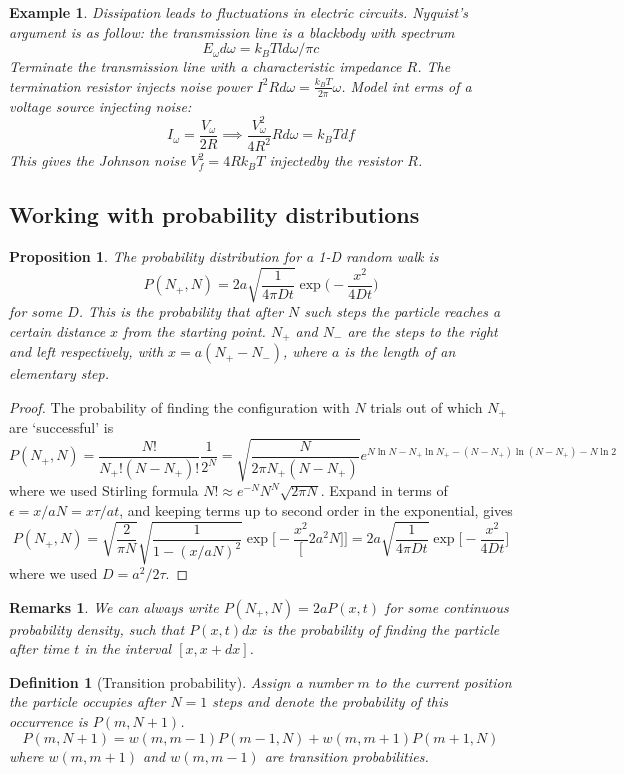 \documentclass[a4paper]{article}
\newtheorem{eg}{Example}[section]
\newtheorem{remarks}{Remarks}[section]
\theoremstyle{new}
\newtheorem{defi}{Definition}[section]
\newtheorem{prop}{Proposition}[section]
\begin{document}
\begin{eg}
Dissipation leads to fluctuations in electric circuits. Nyquist's argument is as follow: the transmission line is a blackbody with spectrum
$$E_\omega d\omega=k_BTld\omega/\pi c$$
Terminate the transmission line with a characteristic impedance $R$. The termination resistor injects noise power $I^2Rd\omega=\frac{k_BT}{2\pi}\omega$. Model int erms of a voltage source injecting noise:
$$I_\omega=\frac{V_\omega}{2R}\implies\frac{V_\omega^2}{4R^2}Rd\omega=k_BTdf $$
This gives the Johnson noise $V_f^2=4Rk_BT$ injectedby the resistor $R$.
\end{eg}
\newpage
\subsection{Working with probability distributions}
\begin{prop}
The probability distribution for a 1-D random walk is
$$P(N_+,N)=2a\sqrt{\frac{1}{4\pi Dt}}\exp\bigg(-\frac{x^2}{4Dt}\bigg)$$
for some $D$. This is the probability that after $N$ such steps the particle reaches a certain distance $x$ from the starting point. $N_+$ and $N_-$ are the steps to the right and left respectively, with $x=a(N_+-N_-)$, where $a$ is the length of an elementary step.
\end{prop}
\begin{proof}
The probability of finding the configuration with $N$ trials out of which $N_+$ are `successful' is
$$P(N_+,N)=\frac{N!}{N_+!(N-N_+)!}\frac{1}{2^N}=\sqrt{\frac{N}{2\pi N_+(N-N_+)}}e^{N\ln N-N_+\ln N_+-(N-N_+)\ln(N-N_+)-N\ln 2}$$
where we used Stirling formula $N!\approx e^{-N}N^N\sqrt{2\pi N}$. Expand in terms of $\epsilon=x/aN=x\tau/at$, and keeping terms up to second order in the exponential, gives
$$P(N_+,N)=\sqrt{\frac{2}{\pi N}}\sqrt{\frac{1}{1-(x/aN)^2}}\exp\bigg[-\frac{x^2}[2a^2N]\bigg]=2a\sqrt{\frac{1}{4\pi Dt}}\exp\bigg[-\frac{x^2}{4Dt}\bigg]$$
where we used $D=a^2/2\tau$. 
\end{proof}
\begin{remarks}
We can always write $P(N_+,N)=2aP(x,t)$ for some continuous probability density, such that $P(x,t)dx$ is the probability of finding the particle after time $t$ in the interval $[x,x+dx]$.
\end{remarks}
\begin{defi}[Transition probability]
Assign a number $m$ to the current position the particle occupies after $N=1$ steps and denote the probability of this occurrence is $P(m,N+1)$.
$$P(m,N+1)=w(m,m-1)P(m-1,N)+w(m,m+1)P(m+1,N)$$
where $w(m,m+1)$ and $w(m,m-1)$ are transition probabilities. 
\end{defi}
\end{document}
